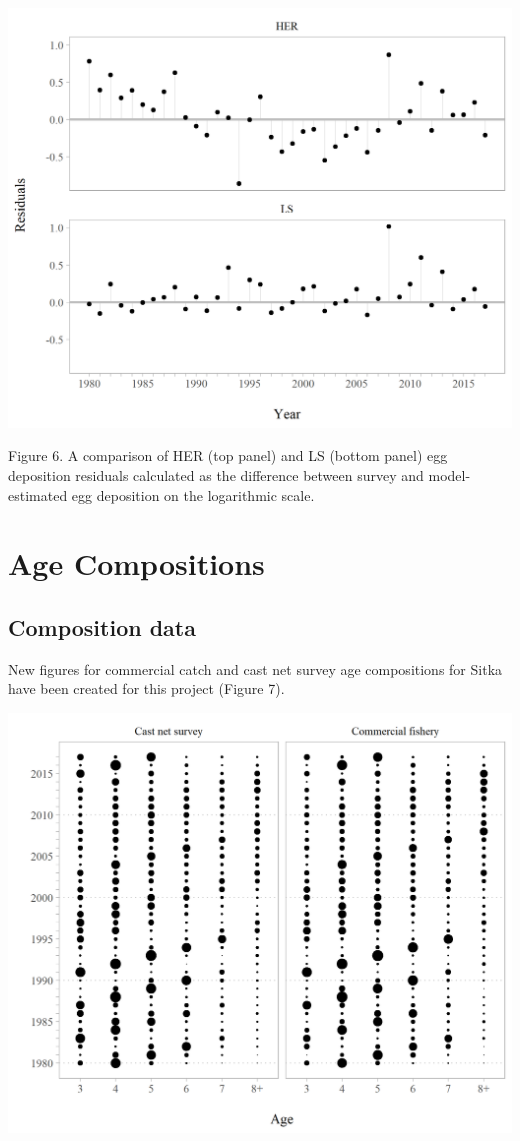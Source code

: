 \documentclass[]{article}
\begin{document}
\includegraphics[width=1\linewidth]{../../HER/figs/compare_eggresids}

Figure 6. A comparison of HER (top panel) and LS (bottom panel) egg
deposition residuals calculated as the difference between survey and
model-estimated egg deposition on the logarithmic scale.

\section{Age Compositions}\label{age-compositions}

\subsection{Composition data}\label{composition-data}

New figures for commercial catch and cast net survey age compositions
for Sitka have been created for this project (Figure 7).

\includegraphics[width=1\linewidth]{../../HER/figs/HER/agecomps_bubbleplot}
\end{document}
